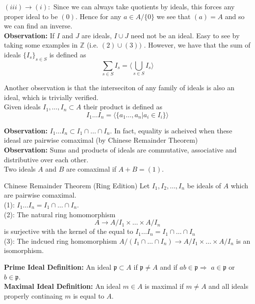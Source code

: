 \documentclass{article}
\newcommand{\Z}{\mathbb{Z}}
\newcommand{\un}{\cup}
\newcommand{\ic}{\cap}
\begin{document}
$(iii) \to (i):$ Since we can always take quotients by ideals, this forces any proper ideal to be $(0)$. 
Hence for any $a \in A/\{0\}$ we see that $(a) = A$ and so we can find an inverse.\\

\textbf{Observation:} If $I$ and $J$ are ideals, $I \un J$ need not be an ideal. Easy to see by taking some examples in $\Z$ (i.e. $(2) \un (3))$
. 
However, we have that the sum of ideals $\{I_s\}_{s \in S}$ is defined as 
\[ \sum_{s \in S} I_s = \langle \bigcup_{s \in S} I_s \rangle\]

Another observation is that the interseciton of any family of ideals is also an ideal, which is trivially verified.\\

Given ideals $I_1, \dots, I_n \subset A$ their product is defined as 
\[I_1 \dots I_n = \langle \{a_1\dots,a_n | a_i \in I_i\}\rangle\]

\textbf{Observation: } $I_1\dots I_n \subset I_1 \cap \dots \cap I_n$. In fact, equality is acheived when these ideasl are pairwise comaximal (by Chinese Remainder Theorem) \\

\textbf{Observation: } Sums and products of ideals are commutative, associative and distributive over each other.\\

Two ideals $A$ and $B$ are comaximal if $A+B = (1)$.
\begin{theo}{Chinese Remainder Theorem (Ring Edition)}{}
Let $I_1, I_2, \dots, I_n$ be ideals of $A$ which are pairwise comaximal.\\ 
\indent (1): $I_1\dots I_n = I_1 \cap \dots \cap I_n$.\\
\indent (2): The natural ring homomorphism
\[A \to A/I_1 \times \dots \times A/I_n\]
is surjective with the kernel of the equal to $I_1\dots I_n = I_1 \cap \dots \cap I_n$\\
\indent (3): The indcued ring homomorphism $A/(I_1 \ic \dots \ic I_n) \to  A/I_1 \times \dots \times A/I_n$ is an isomorphism.
\end{theo}

\textbf{Prime Ideal Definition: } An ideal $\mathfrak{p} \subset A$ if $\mathfrak{p} \neq A$ and if $ab \in \mathfrak{p} \Longrightarrow $ $a \in \mathfrak{p}$ or $b \in \mathfrak{p}$.\\

\textbf{Maximal Ideal Definition: } An ideal $m \in A$ is maximal if $m \neq A$ and all ideals properly continaing $m$ is equal to $A$.\\
\end{document}
